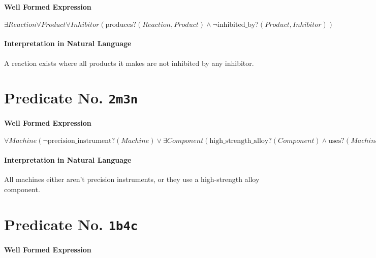 \documentclass[11pt]{article}
\begin{document}
\paragraph*{Well Formed Expression}
\label{sec:orgf7b706c}

\(\exists \mathit{Reaction} \forall \mathit{Product} \forall \mathit{Inhibitor} (\mathrm{produces?}(\mathit{Reaction}, \mathit{Product}) \land \neg \mathrm{inhibited\_by?}(\mathit{Product}, \mathit{Inhibitor}))\)

\paragraph*{Interpretation in Natural Language}
\label{sec:org1e2dffc}

A reaction exists where all products it makes are not inhibited by any inhibitor.



\section{Predicate No. \texttt{2m3n}}
\label{sec:org89e4df3}

\paragraph*{Well Formed Expression}
\label{sec:org1879229}

\(\forall \mathit{Machine} (\neg \mathrm{precision\_instrument?}(\mathit{Machine}) \lor \exists \mathit{Component} (\mathrm{high\_strength\_alloy?}(\mathit{Component}) \land \mathrm{uses?}(\mathit{Machine}, \mathit{Component})))\)

\paragraph*{Interpretation in Natural Language}
\label{sec:orgf2dc46c}

All machines either aren't precision instruments, or they use a high-strength alloy component.



\section{Predicate No. \texttt{1b4c}}
\label{sec:org4f63bd9}

\paragraph*{Well Formed Expression}
\label{sec:org562d268}
\end{document}
